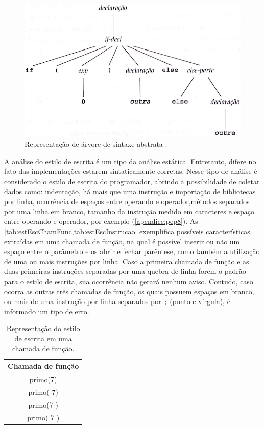 			\begin{figure}[h]
				\centering
				\includegraphics[width=0.7\linewidth]{imagem/AST}
				\caption[Representação de árvore de sintaxe abstrata]{Representação de árvore de sintaxe abstrata \cite{louden2004}.}
				\label{fig:AST}
			\end{figure}
			
			A análise do estilo de escrita é um tipo da análise estática. Entretanto,
			difere no fato das implementações estarem sintaticamente corretas. Nesse
			tipo de análise é considerado o estilo de escrita do programador, abrindo a
			possibilidade de coletar dados como: indentação, há mais que uma instrução e importação
			de bibliotecas por linha, ocorrência de espaços entre operando e operador,métodos
			separados por uma linha em branco, tamanho da instrução  medido em
			caracteres e espaço entre operando e operador, por exemplo (\cref{apendice:pep8}).
			As \cref{tab:estEscChamFunc,tab:estEscInstrucao} exemplifica possíveis características
			extraídas em uma chamada de função, na qual é possível inserir ou não um
			espaço entre o parâmetro e os  abrir e fechar parêntese,
			como também a utilização de uma ou mais instruções por linha. Caso a primeira
			chamada de função e as duas primeiras instruções separadas por uma quebra de linha
			forem o padrão para o estilo de escrita, sua ocorrência não gerará nenhum
			aviso. Contudo, caso ocorra as outras três chamadas de função, os quais
			possuem espaços em branco, ou mais de uma instrução por linha separados
			por \texttt{;} (ponto e vírgula), é informado um tipo de erro.
			
			\begin{table}
				\centering
				\begin{tabular}{|c|}
					\hline
					Chamada de função\\ \hline
					primo(7)\\
					primo( 7)\\
					primo(7 )\\
					primo( 7 )\\
					\hline
				\end{tabular}
				\caption[Representação do estilo de escrita]{Representação do estilo
				de escrita em uma chamada de função.}
				\label{tab:estEscChamFunc}
			\end{table}
			
